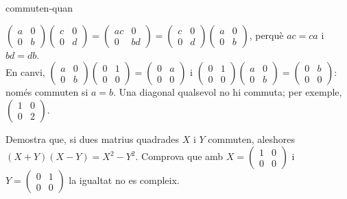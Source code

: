 \begin{apartats}
\begin{tria}{commuten-quan}
\begin{solucio}
$\begin{pmatrix}a&0\\0&b\end{pmatrix}\begin{pmatrix}c&0\\0&d\end{pmatrix}=\begin{pmatrix}ac&0\\0&bd\end{pmatrix}
=\begin{pmatrix}c&0\\0&d\end{pmatrix}\begin{pmatrix}a&0\\0&b\end{pmatrix}$, perquè $ac=ca$ i $bd=db$.\\
En canvi, $\begin{pmatrix}a&0\\0&b\end{pmatrix}\begin{pmatrix}0&1\\0&0\end{pmatrix}=\begin{pmatrix}0&a\\0&0\end{pmatrix}$
i $\begin{pmatrix}0&1\\0&0\end{pmatrix}\begin{pmatrix}a&0\\0&b\end{pmatrix}=\begin{pmatrix}0&b\\0&0\end{pmatrix}$:
només commuten si $a=b$. Una diagonal qualsevol no hi commuta; per exemple, $\begin{pmatrix}1&0\\0&2\end{pmatrix}$.
\end{solucio}
\end{tria}

\begin{nomesllarg}
Demostra que, si dues matrius quadrades $X$ i $Y$ commuten, aleshores $(X+Y)(X-Y)=X^2-Y^2$. Comprova que
amb $X=\begin{pmatrix}1&0\\0&0\end{pmatrix}$ i $Y=\begin{pmatrix}0&1\\0&0\end{pmatrix}$ la igualtat no
es compleix.


\end{nomesllarg}
\end{apartats}

